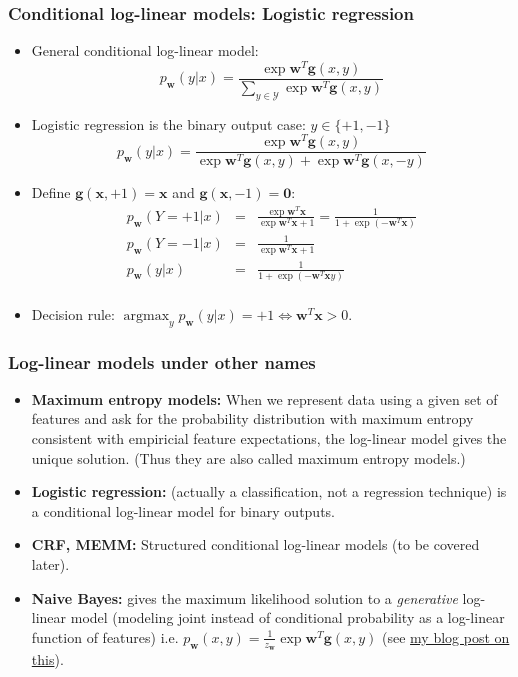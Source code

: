 \documentclass[ignorenonframetext,plain,fleqn]{beamer}
\DeclareMathOperator*{\argmax}{argmax}
\renewcommand{\vec}{\mathbf}
\begin{document}
\begin{frame}\frametitle{Conditional log-linear models: Logistic regression}
\begin{itemize}
\item General conditional log-linear model:\[
  p_\vec{w}(y|x) = \frac{\exp \vec{w}^T \vec{g}(x, y)}
  {\sum_{y\in\mathcal{Y}} \exp \vec{w}^T \vec{g}(x, y)}
\]
\item Logistic regression is the binary output case: $y\in\{+1,-1\}$ \[
  p_\vec{w}(y|x) = \frac{\exp \vec{w}^T \vec{g}(x, y)}
  {\exp \vec{w}^T \vec{g}(x, y)+\exp \vec{w}^T \vec{g}(x, -y)}
\]
\item Define $\vec{g}(\vec{x}, +1) = \vec{x}$ and $\vec{g}(\vec{x},
  -1) = \vec{0}$:
\begin{eqnarray*}
  p_\vec{w}(Y=+1|x) &=&
  \frac{\exp \vec{w}^T \vec{x}}
       {\exp \vec{w}^T \vec{x}+1} =
  \frac{1}{1+\exp(-\vec{w}^T \vec{x})} \\
  p_\vec{w}(Y=-1|x) &=&
  \frac{1}{\exp \vec{w}^T \vec{x}+1} \\
  p_\vec{w}(y|x) &=& 
  \frac{1}{1+\exp(-\vec{w}^T \vec{x} y)} \\
\end{eqnarray*}
\item Decision rule: $\argmax_y p_\vec{w}(y|x)=+1\Leftrightarrow\vec{w}^T\vec{x} > 0$.
\end{itemize}  
\end{frame}

\begin{frame}\frametitle{Log-linear models under other names}
\begin{itemize}
\item \textbf{Maximum entropy models:} When we represent data using a
  given set of features and ask for the probability distribution with
  maximum entropy consistent with empiricial feature expectations, the
  log-linear model gives the unique solution.  (Thus they are also
  called maximum entropy models.)
\item \textbf{Logistic regression:} (actually a classification, not a
  regression technique) is a conditional log-linear model for binary
  outputs.
\item \textbf{CRF, MEMM:} Structured conditional log-linear models (to
  be covered later).
\item \textbf{Naive Bayes:} gives the maximum likelihood solution to a
  {\em generative} log-linear model (modeling joint instead of
  conditional probability as a log-linear function of features)
  i.e. $p_\vec{w}(x,y) = \frac{1}{z_\vec{w}}\exp \vec{w}^T \vec{g}(x, y)$
  (see
  \href{http://www.denizyuret.com/2010/11/naive-bayes-is-joint-maximum-entropy.html}{my
    blog post on this}).
\end{itemize}
\end{frame}
\end{document}
